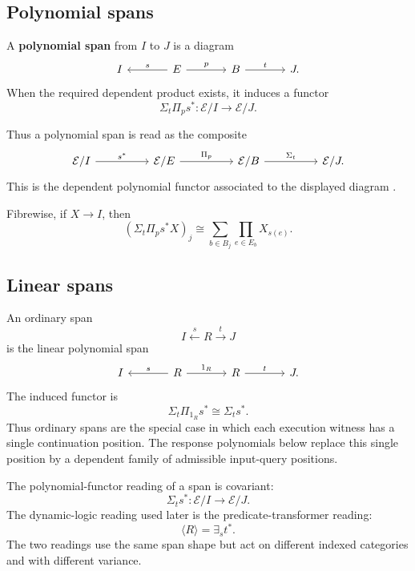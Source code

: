 \subsection{Polynomial spans}
\label{subsec:poly-relative-polynomial-spans}

\begin{definition}
\label{def:poly-relative-polynomial-span}
A \textbf{polynomial span} from \(I\) to \(J\) is a diagram
\[
\begin{tikzcd}[column sep=large]
I
&
E
  \arrow[l,"s"']
  \arrow[r,"p"]
&
B
  \arrow[r,"t"]
&
J.
\end{tikzcd}
\]
When the required dependent product exists, it induces a functor
\[
\Sigma_t\Pi_p s^\ast:
\mathcal E/I\to\mathcal E/J.
\]
\end{definition}

Thus a polynomial span is read as the composite
\[
\begin{tikzcd}[column sep=huge]
\mathcal E/I
  \arrow[r,"s^\ast"]
&
\mathcal E/E
  \arrow[r,"\Pi_p"]
&
\mathcal E/B
  \arrow[r,"\Sigma_t"]
&
\mathcal E/J .
\end{tikzcd}
\]
This is the dependent polynomial functor associated to the displayed diagram
\cite{GambinoKock2013Polynomial}.

Fibrewise, if \(X\to I\), then
\[
\left(\Sigma_t\Pi_p s^\ast X\right)_j
\cong
\sum_{b\in B_j}
\prod_{e\in E_b}
X_{s(e)}.
\]

\subsection{Linear spans}
\label{subsec:poly-relative-linear-spans}

\begin{remark}
\label{rem:poly-relative-linear-spans}
An ordinary span
\[
I\xleftarrow{s}R\xrightarrow{t}J
\]
is the linear polynomial span
\[
\begin{tikzcd}[column sep=large]
I
&
R
  \arrow[l,"s"']
  \arrow[r,"1_R"]
&
R
  \arrow[r,"t"]
&
J.
\end{tikzcd}
\]
The induced functor is
\[
\Sigma_t\Pi_{1_R}s^\ast
\cong
\Sigma_t s^\ast.
\]
Thus ordinary spans are the special case in which each execution witness has a
single continuation position.  The response polynomials below replace this
single position by a dependent family of admissible input-query positions.
\end{remark}

The polynomial-functor reading of a span is covariant:
\[
\Sigma_t s^\ast:\mathcal E/I\to\mathcal E/J.
\]
The dynamic-logic reading used later is the predicate-transformer reading:
\[
\langle R\rangle=\exists_s t^\ast.
\]
The two readings use the same span shape but act on different indexed
categories and with different variance.


